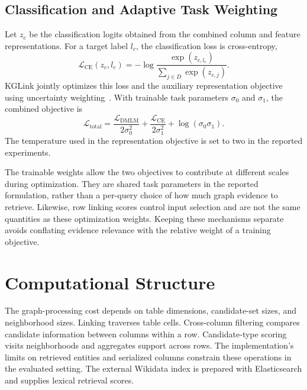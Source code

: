 \subsection{Classification and Adaptive Task Weighting}
\label{sec:kglink:objective}

Let $z_c$ be the classification logits obtained from the combined column and feature representations. For a target label $l_c$, the classification loss is cross-entropy,
\begin{equation}
\mathcal{L}_{\mathrm{CE}}(z_c,l_c)
 =-\log\frac{\exp(z_{c,l_c})}{\sum_{j\in D}\exp(z_{c,j})}.
\label{eq:kglink:classification}
\end{equation}
KGLink jointly optimizes this loss and the auxiliary representation objective using uncertainty weighting~\cite{kglink-kendall2018multi}. With trainable task parameters $\sigma_0$ and $\sigma_1$, the combined objective is
\begin{equation}
\mathcal{L}_{\mathrm{total}}
 =\frac{\mathcal{L}_{\mathrm{DMLM}}}{2\sigma_0^2}
  +\frac{\mathcal{L}_{\mathrm{CE}}}{2\sigma_1^2}
  +\log(\sigma_0\sigma_1).
\label{eq:kglink:joint-loss}
\end{equation}
The temperature used in the representation objective is set to two in the reported experiments.

The trainable weights allow the two objectives to contribute at different scales during optimization. They are shared task parameters in the reported formulation, rather than a per-query choice of how much graph evidence to retrieve. Likewise, row linking scores control input selection and are not the same quantities as these optimization weights. Keeping these mechanisms separate avoids conflating evidence relevance with the relative weight of a training objective.

\section{Computational Structure}
\label{sec:kglink:complexity}

The graph-processing cost depends on table dimensions, candidate-set sizes, and neighborhood sizes. Linking traverses table cells. Cross-column filtering compares candidate information between columns within a row. Candidate-type scoring visits neighborhoods and aggregates support across rows. The implementation's limits on retrieved entities and serialized columns constrain these operations in the evaluated setting. The external Wikidata index is prepared with Elasticsearch and supplies lexical retrieval scores.

